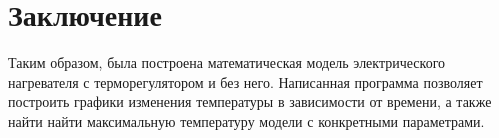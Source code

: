 \section{Заключение}
    Таким образом, была построена математическая модель электрического нагревателя с терморегулятором и без него. Написанная программа позволяет построить графики изменения температуры в зависимости от времени, а также найти найти максимальную температуру модели с конкретными параметрами.
